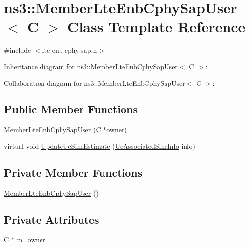 \hypertarget{classns3_1_1MemberLteEnbCphySapUser}{}\section{ns3\+:\+:Member\+Lte\+Enb\+Cphy\+Sap\+User$<$ C $>$ Class Template Reference}
\label{classns3_1_1MemberLteEnbCphySapUser}


{\ttfamily \#include $<$lte-\/enb-\/cphy-\/sap.\+h$>$}



Inheritance diagram for ns3\+:\+:Member\+Lte\+Enb\+Cphy\+Sap\+User$<$ C $>$\+:


Collaboration diagram for ns3\+:\+:Member\+Lte\+Enb\+Cphy\+Sap\+User$<$ C $>$\+:
\subsection*{Public Member Functions}
\begin{DoxyCompactItemize}
\item 
\hyperlink{classns3_1_1MemberLteEnbCphySapUser_a8b5a5057eede66a8f0b7e8b0294eebcd}{Member\+Lte\+Enb\+Cphy\+Sap\+User} (\hyperlink{loss__COST231__small__cities__urban_8m_aaa53ca0b650dfd85c4f59fa156f7a2cc}{C} $\ast$owner)
\item 
virtual void \hyperlink{classns3_1_1MemberLteEnbCphySapUser_a79d39324d505c8cae43c95f0c4cbc38d}{Update\+Ue\+Sinr\+Estimate} (\hyperlink{structns3_1_1LteEnbCphySapUser_1_1UeAssociatedSinrInfo}{Ue\+Associated\+Sinr\+Info} info)
\end{DoxyCompactItemize}
\subsection*{Private Member Functions}
\begin{DoxyCompactItemize}
\item 
\hyperlink{classns3_1_1MemberLteEnbCphySapUser_afae95f2e5ba861bb85e5678a46fee43e}{Member\+Lte\+Enb\+Cphy\+Sap\+User} ()
\end{DoxyCompactItemize}
\subsection*{Private Attributes}
\begin{DoxyCompactItemize}
\item 
\hyperlink{loss__COST231__small__cities__urban_8m_aaa53ca0b650dfd85c4f59fa156f7a2cc}{C} $\ast$ \hyperlink{classns3_1_1MemberLteEnbCphySapUser_a99f9d9d65a857057481e602c88cb5f04}{m\+\_\+owner}
\end{DoxyCompactItemize}


